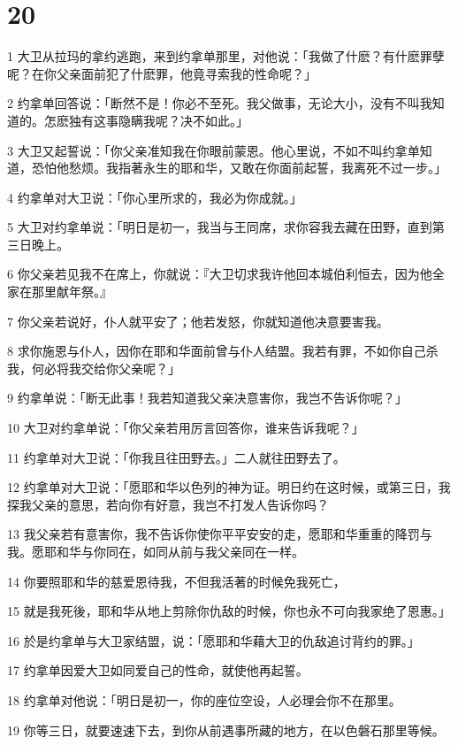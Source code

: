 \chapter{20}

\par 1 大卫从拉玛的拿约逃跑，来到约拿单那里，对他说：「我做了什麽？有什麽罪孽呢？在你父亲面前犯了什麽罪，他竟寻索我的性命呢？」
\par 2 约拿单回答说：「断然不是！你必不至死。我父做事，无论大小，没有不叫我知道的。怎麽独有这事隐瞒我呢？决不如此。」
\par 3 大卫又起誓说：「你父亲准知我在你眼前蒙恩。他心里说，不如不叫约拿单知道，恐怕他愁烦。我指著永生的耶和华，又敢在你面前起誓，我离死不过一步。」
\par 4 约拿单对大卫说：「你心里所求的，我必为你成就。」
\par 5 大卫对约拿单说：「明日是初一，我当与王同席，求你容我去藏在田野，直到第三日晚上。
\par 6 你父亲若见我不在席上，你就说：『大卫切求我许他回本城伯利恒去，因为他全家在那里献年祭。』
\par 7 你父亲若说好，仆人就平安了；他若发怒，你就知道他决意要害我。
\par 8 求你施恩与仆人，因你在耶和华面前曾与仆人结盟。我若有罪，不如你自己杀我，何必将我交给你父亲呢？」
\par 9 约拿单说：「断无此事！我若知道我父亲决意害你，我岂不告诉你呢？」
\par 10 大卫对约拿单说：「你父亲若用厉言回答你，谁来告诉我呢？」
\par 11 约拿单对大卫说：「你我且往田野去。」二人就往田野去了。
\par 12 约拿单对大卫说：「愿耶和华以色列的神为证。明日约在这时候，或第三日，我探我父亲的意思，若向你有好意，我岂不打发人告诉你吗？
\par 13 我父亲若有意害你，我不告诉你使你平平安安的走，愿耶和华重重的降罚与我。愿耶和华与你同在，如同从前与我父亲同在一样。
\par 14 你要照耶和华的慈爱恩待我，不但我活著的时候免我死亡，
\par 15 就是我死後，耶和华从地上剪除你仇敌的时候，你也永不可向我家绝了恩惠。」
\par 16 於是约拿单与大卫家结盟，说：「愿耶和华藉大卫的仇敌追讨背约的罪。」
\par 17 约拿单因爱大卫如同爱自己的性命，就使他再起誓。
\par 18 约拿单对他说：「明日是初一，你的座位空设，人必理会你不在那里。
\par 19 你等三日，就要速速下去，到你从前遇事所藏的地方，在以色磐石那里等候。
